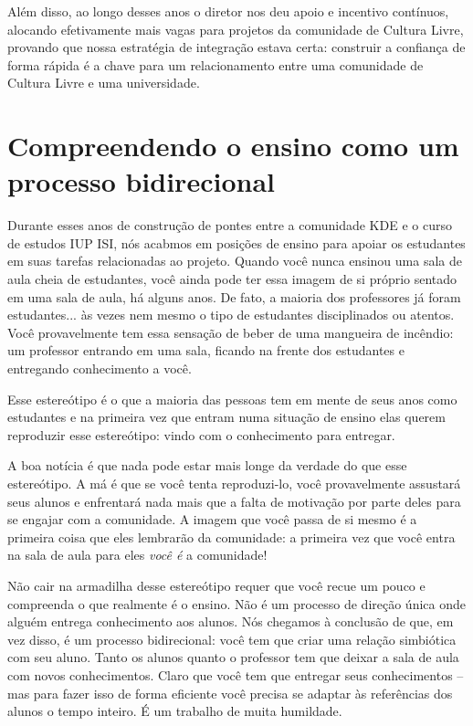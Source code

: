 Além disso, ao longo desses anos o diretor nos deu apoio e incentivo contínuos,
alocando efetivamente mais vagas para projetos da comunidade de Cultura Livre, 
provando que nossa estratégia de integração estava certa: construir a confiança de
forma rápida é a chave para um relacionamento entre uma comunidade de Cultura Livre
e uma universidade.

\section*{Compreendendo o ensino como um processo bidirecional}
Durante esses anos de construção de pontes entre a comunidade KDE e o curso de estudos
IUP ISI, nós acabmos em posições de ensino para apoiar os estudantes em suas tarefas
relacionadas ao projeto. Quando você nunca ensinou uma sala de aula cheia de estudantes,
você ainda pode ter essa imagem de si próprio sentado em uma sala de aula, há alguns anos.
De fato, a maioria dos professores já foram estudantes... às vezes nem mesmo o tipo
de estudantes disciplinados ou atentos. Você provavelmente tem essa sensação de beber
de uma mangueira de incêndio: um professor entrando em uma sala, ficando na frente dos
estudantes e entregando conhecimento a você.

Esse estereótipo é o que a maioria das pessoas tem em mente de seus anos como estudantes
e na primeira vez que entram numa situação de ensino elas querem reproduzir esse estereótipo:
vindo com o conhecimento para entregar.

A boa notícia é que nada pode estar mais longe da verdade do que esse estereótipo.
A má é que se você tenta reproduzi-lo, você provavelmente assustará seus alunos
e enfrentará nada mais que a falta de motivação por parte deles para se engajar com
a comunidade. A imagem que você passa de si mesmo é a primeira coisa que eles lembrarão
da comunidade: a primeira vez que você entra na sala de aula para eles \emph{você é} a
comunidade!

Não cair na armadilha desse estereótipo requer que você recue um pouco e compreenda
o que realmente é o ensino. Não é um processo de direção única onde alguém entrega
conhecimento aos alunos. Nós chegamos à conclusão de que, em vez disso, é um processo
bidirecional: você tem que criar uma relação simbiótica com seu aluno.
Tanto os alunos quanto o professor tem que deixar a sala de aula com novos conhecimentos.
Claro que você tem que entregar seus conhecimentos -- mas para fazer isso de forma eficiente
você precisa se adaptar às referências dos alunos o tempo inteiro. É um trabalho de muita humildade.


